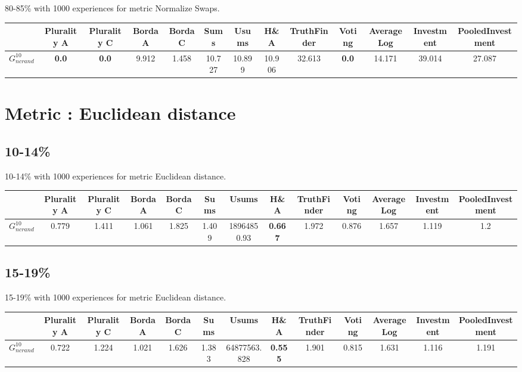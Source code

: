 \documentclass{article}
\newcommand{\graph}[2]{$G_{#1}^{#2}$}
\begin{document}
80-85\% with 1000 experiences for metric Normalize Swaps.

\noindent\begin{tabular}{|l|c|c|c|c|c|c|c|c|c|c|c|c|}
\hline
& Plurality A& Plurality C& Borda A& Borda C& Sums& Usums& H\&A& TruthFinder& Voting& AverageLog& Investment& PooledInvestment\\
\hline
\graph{ncrand}{10} &\textbf{0.0}&\textbf{0.0}&9.912&1.458&10.727&10.899&10.906&32.613&\textbf{0.0}&14.171&39.014&27.087\\
\hline
\end{tabular}
\newpage
\newpage
\section{Metric : Euclidean distance}

\newpage

\subsection{10-14\%}

10-14\% with 1000 experiences for metric Euclidean distance.

\noindent\begin{tabular}{|l|c|c|c|c|c|c|c|c|c|c|c|c|}
\hline
& Plurality A& Plurality C& Borda A& Borda C& Sums& Usums& H\&A& TruthFinder& Voting& AverageLog& Investment& PooledInvestment\\
\hline
\graph{ncrand}{10} &0.779&1.411&1.061&1.825&1.409&18964850.93&\textbf{0.667}&1.972&0.876&1.657&1.119&1.2\\
\hline
\end{tabular}
\newpage

\subsection{15-19\%}

15-19\% with 1000 experiences for metric Euclidean distance.

\noindent\begin{tabular}{|l|c|c|c|c|c|c|c|c|c|c|c|c|}
\hline
& Plurality A& Plurality C& Borda A& Borda C& Sums& Usums& H\&A& TruthFinder& Voting& AverageLog& Investment& PooledInvestment\\
\hline
\graph{ncrand}{10} &0.722&1.224&1.021&1.626&1.383&64877563.828&\textbf{0.555}&1.901&0.815&1.631&1.116&1.191\\
\hline
\end{tabular}
\newpage
\end{document}
